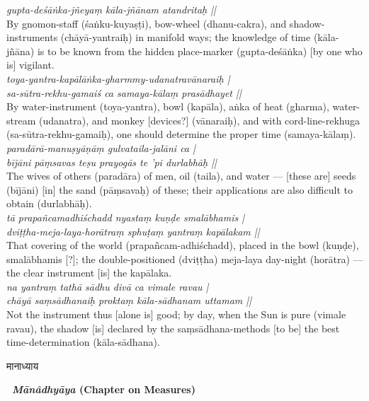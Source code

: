 \documentclass[11pt,a4paper]{article}
\newcommand{\dev}[1]{{\devanagarifont #1}}
\newcommand{\bilingualpair}[2]{%
  \noindent%
  \begin{minipage}[t]{0.48\textwidth}
    #1%
  \end{minipage}%
  \hfill%
  \begin{minipage}[t]{0.48\textwidth}
    #2%
  \end{minipage}%
  \par\vspace{0.5em}%
}
\newenvironment{sanskritcol}{\devanagarifont\small}{}
\newenvironment{englishcol}{\iastfont\small}{}
\begin{document}
{\begin{englishcol}
\textit{gupta-deśāṅka-jñeyaṃ kāla-jñānam atandritaḥ ||}\\[0.3em]
By gnomon-staff (\'saṅku-kuyaṣṭi), bow-wheel (dhanu-cakra), and shadow-instruments (chāyā-yantraiḥ) in manifold ways; the knowledge of time (kāla-jñāna) is to be known from the hidden place-\-marker (gupta-deśāṅka) [by one who is] vigilant.\\[0.5em]
\textit{toya-yantra-kapālāṅka-gharmmy-udanatravānaraiḥ |}\\[0.3em]
\textit{sa-sūtra-rekhu-gamaiś ca samaya-kālaṃ prasādhayet ||}\\[0.3em]
By water-instrument (toya-yantra), bowl (kapāla), aṅka of heat (gharma), water-\-stream (udanatra), and monkey [devices?] (vānaraiḥ), and with cord-\-line-\-rekhuga (sa-sūtra-rekhu-gamaiḥ), one should determine the proper time (samaya-kālaṃ).\\[0.5em]
\textit{paradārā-manuṣyāṇāṃ gulvataila-jalāni ca |}\\[0.3em]
\textit{bījāni pāṃsavas teṣu prayogās te 'pi durlabhāḥ ||}\\[0.3em]
The wives of others (paradāra) of men, oil (taila), and water --- [these are] seeds (bījāni) [in] the sand (pāṃsavaḥ) of these; their applications are also difficult to obtain (durlabhāḥ).\\[0.5em]
\textit{tā prapañcamadhiśchadd nyastaṃ kuṇḍe smalābhamis |}\\[0.3em]
\textit{dviṭṭha-meja-laya-horātraṃ sphuṭaṃ yantraṃ kapālakam ||}\\[0.3em]
That covering of the world (prapañcam-adhiśchadd), placed in the bowl (kuṇḍe), smalābhamis [?]; the double-\-positioned (dviṭṭha) meja-laya day-\-night (horātra) --- the clear instrument [is] the kapālaka.\\[0.5em]
\textit{na yantraṃ tathā sādhu divā ca vimale ravau |}\\[0.3em]
\textit{chāyā saṃsādhanaiḥ proktaṃ kāla-sādhanam uttamam ||}\\[0.3em]
Not the instrument thus [alone is] good; by day, when the Sun is pure (vimale ravau), the shadow [is] declared by the saṃsādhana-\-methods [to be] the best time-determination (kāla-sādhana).
\end{englishcol}%
}

\vspace{0.5cm}
\bilingualpair{%
\begin{sanskritcol}
\dev{मानाध्याय}
\end{sanskritcol}%
}{%
\begin{englishcol}
\textbf{\textbar\ \textit{Mānâdhyāya} (Chapter on Measures)}
\end{englishcol}%
}
\end{document}
